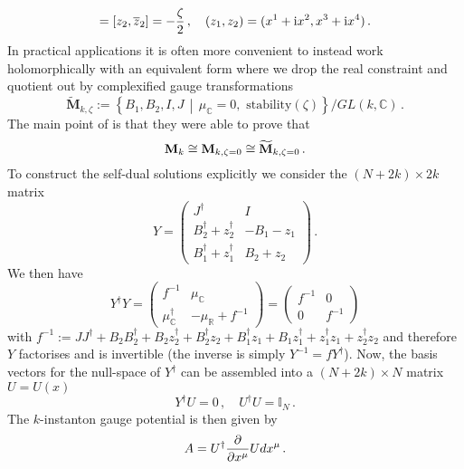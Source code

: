 \documentclass[main.tex]{subfiles}
\begin{document}
\begin{equation}
[z_1,\overline{z}_1]=[z_2,\overline{z}_2]=-\frac{\zeta}{2}\,,\quad (z_1,z_2)=(x^1+\iu x^2,x^3+\iu x^4)\,.
\end{equation}
In practical applications it is often more convenient to instead work holomorphically with an equivalent form where we drop the real constraint and quotient out by complexified gauge transformations 
\begin{equation}
\widetilde{\mathbf{M}}_{k,\zeta}:=\left\{B_1,B_2,I,J\,\middle|\,\mu_{\mathbb{C}}=0,\text{ stability}(\zeta)\right\}/GL(k,\mathbb{C})\,.
\end{equation}
The main point of \cite{Atiyah:1978ri} is that they were able to prove that 
\begin{equation}
\mathbf{M}_{k}\cong\mathbf{M}_{k,\zeta=0}\cong\widetilde{\mathbf{M}}_{k,\zeta=0}\,.
\end{equation}
To construct the self-dual solutions explicitly we consider the $(N+2k)\times 2k$ matrix
\begin{equation}
Y=\begin{pmatrix}
J^{\dagger}& I\\
B_2^{\dagger}+z_2^{\dagger}&-B_1-z_1\\
B_1^{\dagger}+z_1^{\dagger}&B_2+z_2
\end{pmatrix}\,.
\end{equation}
We then have
\begin{equation}
Y^{\dagger}Y=\begin{pmatrix}f^{-1}&\mu_{\mathbb{C}}\\
\mu_{\mathbb{C}}^{\dagger}&-\mu_{\mathbb{R}}+f^{-1}
\end{pmatrix}=\begin{pmatrix}f^{-1}&0\\
0&f^{-1}
\end{pmatrix}
\end{equation}
with $f^{-1}:=JJ^{\dagger}+B_2B_2^{\dagger}+B_2z_2^{\dagger}+B_2^{\dagger}z_2+B_1^{\dagger}z_1+B_1z_1^{\dagger}+z_1^{\dagger}z_1+z_2^{\dagger}z_2$ and therefore $Y$ factorises and is invertible (the inverse is simply $Y^{-1}=f Y^{\dagger}$).  Now, the basis vectors for the null-space of $Y^{\dagger}$ can be assembled into a $(N+2k)\times N$ matrix $U=U(x)$ 
\begin{equation}
Y^{\dagger}U=0\,,\quad U^{\dagger}U=\mathbb{I}_N\,.
\end{equation}
The $k$-instanton gauge potential is then given by
\begin{equation}\label{eqn:genericinstsolution}
A=U^{\dagger}\frac{\partial}{\partial x^{\mu}}Ud x^{\mu}\,.
\end{equation}
\end{document}
